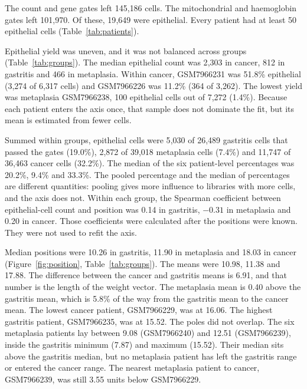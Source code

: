 \documentclass[11pt,a4paper]{article}
\begin{document}
The count and gene gates left 145{,}186 cells. The mitochondrial and haemoglobin gates left 101{,}970. Of these, 19{,}649 were epithelial. Every patient had at least 50 epithelial cells (Table~\ref{tab:patients}).

Epithelial yield was uneven, and it was not balanced across groups (Table~\ref{tab:groups}). The median epithelial count was 2{,}303 in cancer, 812 in gastritis and 466 in metaplasia. Within cancer, GSM7966231 was 51.8\% epithelial (3{,}274 of 6{,}317 cells) and GSM7966226 was 11.2\% (364 of 3{,}262). The lowest yield was metaplasia GSM7966238, 100 epithelial cells out of 7{,}272 (1.4\%). Because each patient enters the axis once, that sample does not dominate the fit, but its mean is estimated from fewer cells.

Summed within groups, epithelial cells were 5{,}030 of 26{,}489 gastritis cells that passed the gates (19.0\%), 2{,}872 of 39{,}018 metaplasia cells (7.4\%) and 11{,}747 of 36{,}463 cancer cells (32.2\%). The median of the six patient-level percentages was 20.2\%, 9.4\% and 33.3\%. The pooled percentage and the median of percentages are different quantities: pooling gives more influence to libraries with more cells, and the axis does not. Within each group, the Spearman coefficient between epithelial-cell count and position was 0.14 in gastritis, $-0.31$ in metaplasia and 0.20 in cancer. Those coefficients were calculated after the positions were known. They were not used to refit the axis.

Median positions were 10.26 in gastritis, 11.90 in metaplasia and 18.03 in cancer (Figure~\ref{fig:position}, Table~\ref{tab:groups}). The means were 10.98, 11.38 and 17.88. The difference between the cancer and gastritis means is 6.91, and that number is the length of the weight vector. The metaplasia mean is 0.40 above the gastritis mean, which is 5.8\% of the way from the gastritis mean to the cancer mean. The lowest cancer patient, GSM7966229, was at 16.06. The highest gastritis patient, GSM7966235, was at 15.52. The poles did not overlap. The six metaplasia patients lay between 9.08 (GSM7966240) and 12.51 (GSM7966239), inside the gastritis minimum (7.87) and maximum (15.52). Their median sits above the gastritis median, but no metaplasia patient has left the gastritis range or entered the cancer range. The nearest metaplasia patient to cancer, GSM7966239, was still 3.55 units below GSM7966229.
\end{document}
